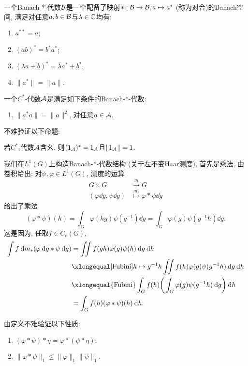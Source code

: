 \begin{definition}
    一个Banach-*-代数$\mathcal{B}$是一个配备了映射$*:\mathcal{B} \to \mathcal{B},a \mapsto a^*$ (称为对合)的Banach空间, 满足对任意$a,b \in \mathcal{B}$与$\lambda \in \mathbb{C}$均有:
    \begin{enumerate}
        \item[(i)] $a^{**} = a$;
        \item[(ii)] $(ab)^* = b^*a^*$;
        \item[(iii)] $(\lambda a+b)^* = \bar{\lambda} a^*+b^*$;
        \item[(iv)] $\|a^*\| = \|a\|$. 
    \end{enumerate}

    一个$C^*$-代数$\mathcal{A}$是满足如下条件的Banach-*-代数:
    \begin{enumerate}
        \item[(iv)'] $\|a^*a\| = \|a\|^2$, 对任意$a \in \mathcal{A}$.
    \end{enumerate}
\end{definition}
不难验证以下命题:
\begin{proposition}
    若$C^*$-代数$\mathcal{A}$含幺, 则$(1_{\mathcal{A}})^*  = 1_{\mathcal{A}}$且$\|1_{\mathcal{A}}\| = 1$.
\end{proposition}
我们在$L^1(G)$上构造Banach-*-代数结构 (关于左不变Haar测度), 
首先是乘法, 由卷积给出: 对$\psi,\varphi \in L^1(G)$, 测度的运算\begin{align*}
    G \times G & \overset{m}{\to} G \\ (\varphi \dd g, \psi \dd g) & \overset{m_*}{\mapsto} \varphi * \psi \dd g
\end{align*}给出了乘法\[(\varphi*\psi)(h) = \int_G \varphi(hg)\psi(g^{-1})\dd g = \int_G \varphi(g)\psi(g^{-1}h)\dd g.\]
这是因为, 任取$f \in C_c(G)$, \begin{align*}
    \int f \dd m_*(\varphi \dd g * \psi \dd g) 
    &= \iint f(gh)\varphi(g)\psi(h) \dd g\dd h \\
    &\xlongequal[\text{Fubini}]{h \mapsto g^{-1}h} \iint f(h)\varphi(g)\psi(g^{-1}h) \dd g \dd h \\ 
    &\xlongequal{\text{Fubini}} \int_G f(h)\bigg(\int_G \varphi(g)\psi(g^{-1}h)\dd g\bigg)\dd h \\
    &= \int_G f(h)(\varphi * \psi)(h) \dd h.
\end{align*}

由定义不难验证以下性质:
\begin{proposition}
    \begin{enumerate}
        \item[(i)] $(\varphi * \psi) * \eta = \varphi * (\psi * \eta)$;
        \item[(ii)] $\|\varphi * \psi\|_1 \leqslant \|\varphi\|_1\|\psi\|_1$. 
    \end{enumerate}
\end{proposition}

